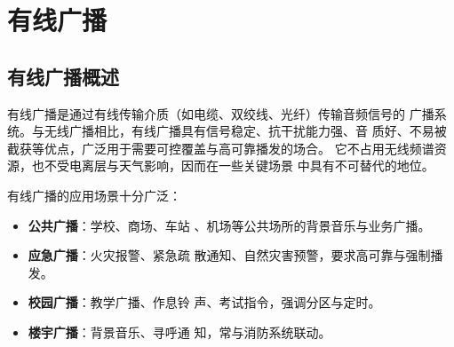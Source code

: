 
\chapter{有线广播}
\label{chap:wired_broadcast}

\section{有线广播概述}
\label{sec:wired_broadcast_intro}

有线广播是通过有线传输介质（如电缆、双绞线、光纤）传输音频信号的
广播系统。与无线广播相比，有线广播具有信号稳定、抗干扰能力强、音
质好、不易被截获等优点，广泛用于需要可控覆盖与高可靠播发的场合。
它不占用无线频谱资源，也不受电离层与天气影响，因而在一些关键场景
中具有不可替代的地位。

有线广播的应用场景十分广泛：

\begin{itemize}
    \item \textbf{公共广播}：学校、商场、车站
、机场等公共场所的背景音乐与业务广播。
    \item \textbf{应急广播}：火灾报警、紧急疏
散通知、自然灾害预警，要求高可靠与强制播发。
    \item \textbf{校园广播}：教学广播、作息铃
声、考试指令，强调分区与定时。
    \item \textbf{楼宇广播}：背景音乐、寻呼通
知，常与消防系统联动。
\end{itemize}

